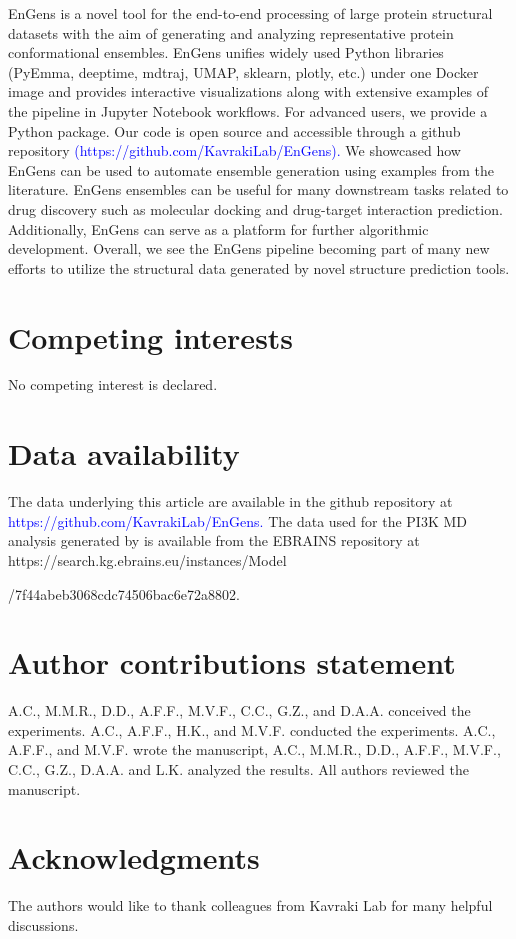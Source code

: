 \documentclass[unnumsec,webpdf,contemporary,large,numsquare]{oup-authoring-template}%
\theoremstyle{thmstyleone}%
\theoremstyle{thmstyletwo}%
\theoremstyle{thmstylethree}%
\begin{document}
EnGens is a novel tool for the end-to-end processing of large protein structural datasets with the aim of generating and analyzing representative protein conformational ensembles. EnGens unifies widely used Python libraries (PyEmma, deeptime, mdtraj, UMAP, sklearn, plotly, etc.) under one Docker image and provides interactive visualizations along with extensive examples of the pipeline in Jupyter Notebook workflows. For advanced users, we provide a Python package. Our code is open source and accessible through a github repository \textcolor{blue}{(https://github.com/KavrakiLab/EnGens).} We showcased how EnGens can be used to automate ensemble generation using examples from the literature.  EnGens ensembles can be useful for many downstream tasks related to drug discovery such as molecular docking and drug-target interaction prediction. Additionally, EnGens can serve as a platform for further algorithmic development. Overall, we see the EnGens pipeline becoming part of many new efforts to utilize the structural data generated by novel structure prediction tools. 


\section{Competing interests}
No competing interest is declared.

\section{Data availability}
The data underlying this article are available in the github repository at \textcolor{blue}{https://github.com/KavrakiLab/EnGens.} 
The data used for the PI3K MD analysis generated by \citep{galdadas_unravelling_2020} is available from the EBRAINS repository at https://search.kg.ebrains.eu/instances/Model

/7f44abeb3068cdc74506bac6e72a8802.

\section{Author contributions statement}
A.C., M.M.R., D.D., A.F.F., M.V.F., C.C., G.Z., and D.A.A. conceived the experiments. A.C., A.F.F., H.K., and M.V.F. conducted the experiments. A.C., A.F.F., and M.V.F. wrote the manuscript, A.C., M.M.R., D.D., A.F.F., M.V.F., C.C., G.Z., D.A.A. and L.K. analyzed the results. All authors reviewed the manuscript.

\section{Acknowledgments}
The authors would like to thank colleagues from Kavraki Lab for many helpful discussions. 
\end{document}
